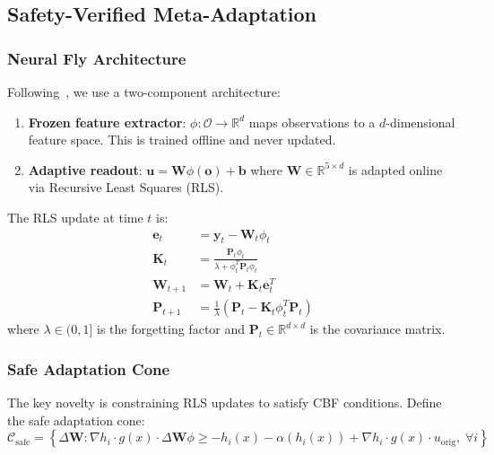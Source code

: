\documentclass[11pt,twocolumn]{article}
\theoremstyle{definition}
\newcommand{\R}{\mathbb{R}}
\newcommand{\cC}{\mathcal{C}}
\newcommand{\cO}{\mathcal{O}}
\newcommand{\vect}[1]{\mathbf{#1}}
\newcommand{\mat}[1]{\mathbf{#1}}
\begin{document}
\subsection{Safety-Verified Meta-Adaptation}
\label{sec:meta_adaptation}

\subsubsection{Neural Fly Architecture}

Following~\citet{NeuralFly2022}, we use a two-component architecture:
\begin{enumerate}[leftmargin=*]
    \item \textbf{Frozen feature extractor}: $\phi: \cO \to \R^d$ maps observations to a $d$-dimensional feature space. This is trained offline and never updated.
    \item \textbf{Adaptive readout}: $\vect{u} = \mat{W} \phi(\vect{o}) + \vect{b}$ where $\mat{W} \in \R^{5 \times d}$ is adapted online via Recursive Least Squares (RLS).
\end{enumerate}

The RLS update at time $t$ is:
\begin{align}
\vect{e}_t &= \vect{y}_t - \mat{W}_t \phi_t \label{eq:rls_error} \\
\mat{K}_t &= \frac{\mat{P}_t \phi_t}{\lambda + \phi_t^T \mat{P}_t \phi_t} \label{eq:kalman_gain} \\
\mat{W}_{t+1} &= \mat{W}_t + \mat{K}_t \vect{e}_t^T \label{eq:weight_update} \\
\mat{P}_{t+1} &= \frac{1}{\lambda}\left(\mat{P}_t - \mat{K}_t \phi_t^T \mat{P}_t\right) \label{eq:covariance_update}
\end{align}
where $\lambda \in (0, 1]$ is the forgetting factor and $\mat{P}_t \in \R^{d \times d}$ is the covariance matrix.

\subsubsection{Safe Adaptation Cone}

The key novelty is constraining RLS updates to satisfy CBF conditions. Define the safe adaptation cone:
\begin{equation}
\label{eq:safe_cone}
\cC_{\text{safe}} = \left\{\Delta \mat{W} : \nabla h_i \cdot g(x) \cdot \Delta \mat{W} \phi \geq -h_i(x) - \alpha(h_i(x)) + \nabla h_i \cdot g(x) \cdot u_{\text{orig}}, \; \forall i\right\}
\end{equation}
\end{document}

